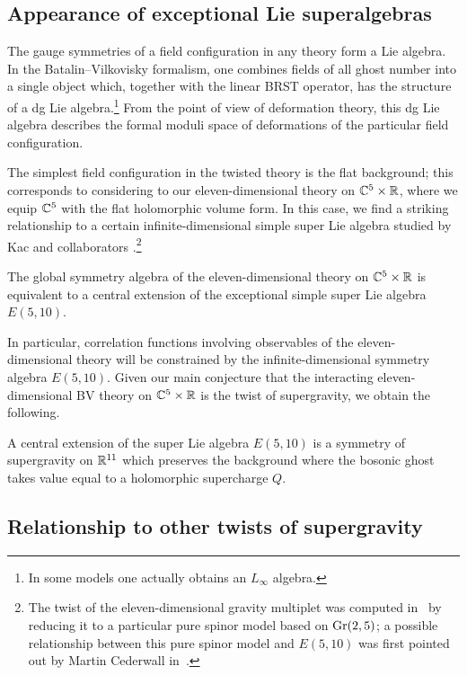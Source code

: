 \subsection*{Appearance of exceptional Lie superalgebras}

The gauge symmetries of a field configuration in any theory form a Lie algebra. 
In the Batalin--Vilkovisky formalism, one combines fields of all ghost number into a single object which, together with the linear BRST operator, has the structure of a dg Lie algebra.\footnote{In some models one actually obtains an $L_\infty$ algebra.} 
From the point of view of deformation theory, this dg Lie algebra describes the formal moduli space of deformations of the particular field configuration. 

The simplest field configuration in the twisted theory is the flat background; this corresponds to considering to our eleven-dimensional theory on $\mathbb C^5 \times \mathbb R$, where we equip $\mathbb C^5$ with the flat holomorphic volume form. 
In this case, we find a striking relationship to a certain infinite-dimensional simple super Lie algebra studied by Kac and collaborators \cite{KacBible,KacE510}.\footnote{The twist of the eleven-dimensional gravity multiplet was computed in~\cite{SWspinor} by reducing it to a particular pure spinor model based on ${\rm Gr}(2,5)$; a possible relationship between this pure spinor model and $E(5,10)$ was first pointed out by Martin Cederwall in~\cite{martinSL5}.}

\begin{thm}
The global symmetry algebra of the eleven-dimensional theory on $\mathbb C^5 \times \mathbb R$ is equivalent to a central extension of the exceptional simple super Lie algebra $E(5,10)$. 
\end{thm}

In particular, correlation functions involving observables of the eleven-dimensional theory will be constrained by the infinite-dimensional symmetry algebra $E(5,10)$. 
Given our main conjecture that the interacting eleven-dimensional BV theory on $\mathbb C^5 \times \mathbb R$ is the twist of supergravity, we obtain the following.

\begin{conj} 
A central extension of the super Lie algebra $E(5,10)$ is a symmetry of supergravity on $\mathbb R^{11}$ which preserves the background where the bosonic ghost takes value equal to a holomorphic supercharge $Q$.
\end{conj}

\subsection*{Relationship to other twists of supergravity} 

